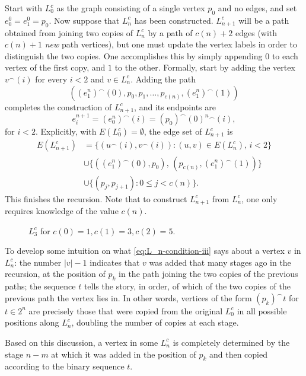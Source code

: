 Start with $L^c_0$ as the graph consisting of a single vertex $p_0$ and no edges, and set $e^0_0=e^0_1=p_0$.
Now suppose that $L^c_n$ has been constructed.
$L^c_{n+1}$ will be a path obtained from joining two copies of $L^c_n$ by a path of $c(n)+2$ edges (with $c(n)+1$ \emph{new} path vertices), but one must update the vertex labels in order to distinguish the two copies.
One accomplishes this by simply appending $0$ to each vertex of the first copy, and $1$ to the other.
Formally, start by adding the vertex $v^\frown(i)$ for every $i<2$ and $v\in L^c_n$.
Adding the path $$((e_1^n)^\smallfrown(0),p_0,p_1,\dots,p_{c(n)},(e_1^n)^\smallfrown(1))$$ completes the construction of $L^c_{n+1}$, and its endpoints are $$e_i^{n+1}=(e_0^n)^\smallfrown(i)=(p_0)^\smallfrown(0)^n{}^\smallfrown(i),$$ for $i<2$.
Explicitly, with $E(L^c_0)=\emptyset$, the edge set of $L^c_{n+1}$ is
\begin{align*}
E(L^c_{n+1})&=\bigl\{(u^\smallfrown(i),v^\smallfrown(i)):(u,v)\in E(L^c_n),\,i<2\bigr\}\\
&\cup\bigl\{((e_1^n)^\smallfrown(0),p_0),\,(p_{c(n)},(e_1^n)^\smallfrown(1))\bigr\}\\
&\cup\bigl\{(p_j,p_{j+1}):0\leq j<c(n)\bigr\}.\label{eq:Ln-edges}
\end{align*}
This finishes the recursion.
Note that to construct $L^c_{n+1}$ from $L^c_n$, one only requires knowledge of the value $c(n)$.

\begin{figure}[ht]
    \centering
    
    \caption{$L_3^c$ for $c(0)=1,c(1)=3,c(2)=5$.}
    \label{fig:L_n}
\end{figure}

To develop some intuition on what \eqref{eq:L_n-condition-iii} says about a vertex $v$ in $L^c_n$: the number $|v|-1$ indicates that $v$ was added that many stages ago in the recursion, at the position of $p_k$ in the path joining the two copies of the previous paths; the sequence $t$ tells the story, in order, of which of the two copies of the previous path the vertex lies in.
In other words, vertices of the form $(p_k)^\smallfrown t$ for $t\in 2^n$ are precisely those that were copied from the original $L^c_0$ in all possible positions along $L^c_n$, doubling the number of copies at each stage.

Based on this discussion, a vertex in some $L^c_n$ is completely determined by the stage $n-m$ at which it was added in the position of $p_k$ and then copied according to the binary sequence $t$.

